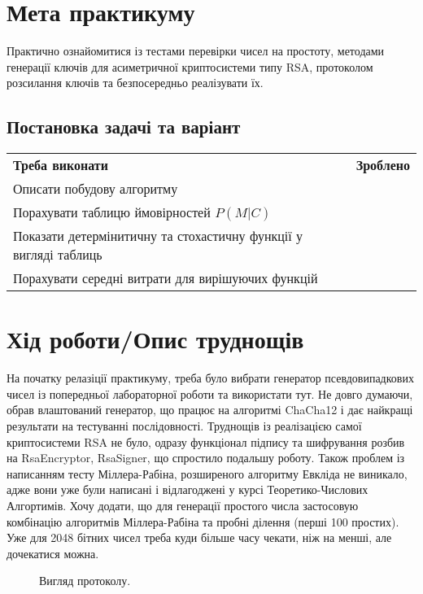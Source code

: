 \section{Мета практикуму}
Практично ознайомитися із тестами перевірки чисел на простоту, методами генерації ключів для асиметричної криптосистеми типу RSA, протоколом розсилання ключів та безпосередньо реалізувати їх.

\subsection{Постановка задачі та варіант}
\begin{tabularx}{\textwidth}{X|X}
	\textbf{Треба виконати} & \textbf{Зроблено} \\
	Описати побудову алгоритму \checkmark\\
	Порахувати таблицю ймовірностей $P(\textit{M}|\textit{C})$ \checkmark\\
	Показати детермінитичну та стохастичну функції у вигляді таблиць & \checkmark\\
	Порахувати середні витрати для вирішуючих функцій & \checkmark\\
\end{tabularx}



\section{Хід роботи/Опис труднощів}
На початку релазіції практикуму, треба було вибрати генератор псевдовипадкових чисел із попередньої лабораторної роботи та  використати тут. Не довго думаючи, обрав влаштований генератор, що працює на алгоритмі ChaCha12 і дає найкращі результати на тестуванні послідовності. Труднощів із реалізацією самої криптосистеми RSA не було, одразу  функціонал підпису та шифрування розбив на RsaEncryptor, RsaSigner, що спростило подальшу роботу. Також проблем із написанням тесту Міллера-Рабіна, розширеного алгоритму Евкліда не виникало, адже вони уже були написані і відлагоджені у курсі Теоретико-Числових Алгортимів.
Хочу додати, що для генерації простого числа застосовую комбінацію алгоритмів Міллера-Рабіна та пробні ділення (перші 100 простих). Уже для 2048 бітних чисел треба куди більше часу чекати, ніж на менші, але дочекатися можна.


\begin{figure}[h]
			\caption{Вигляд протоколу.}
			\label{fig:protocole}
		\end{figure}


